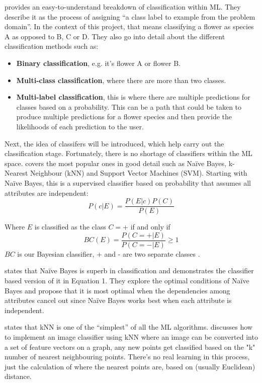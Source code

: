 \documentclass[12pt,a4paper]{report}
\begin{document}
\citet{brownlee2020} provides an easy-to-understand breakdown of classification within ML. They describe it 
as the process of assigning “a class label to example from the problem domain”. In the context of this project, that 
means classifying a 
flower as species A as opposed to B, C or D. They also go into detail about the different classification methods such 
as:
\begin{itemize}
    \item \textbf{Binary classification}, e.g. it's flower A or flower B.
    \item \textbf{Multi-class classification}, where there are more than two classes.
    \item \textbf{Multi-label classification}, this is where there are multiple predictions for classes based on a probability. 
    This can be a path that could be taken to produce multiple predictions for a flower species and then provide 
    the likelihoods of each prediction to the user.
\end{itemize}
Next, the idea of classifers will be introduced, which help carry out the classification stage. Fortunately, 
there is no shortage of classifiers within the ML space. \citet{MohammedMohssen2017Ml:a} covers the most popular ones in 
good detail such as Naïve Bayes, k-Nearest Neighbour (kNN) and Support Vector Machines (SVM). Starting with Naïve Bayes, this 
is a supervised classifier based on probability that assumes all attributes are independent:
\begin{equation}
P(c|E) = \frac{P(E|c)P(C)}{P(E)}
\end{equation}

Where \(E\) is classified as the class \(C = +\) if and only if
\[BC(E) = \frac{P(C = +|E)}{P(C = -|E)} \geq 1\]
\(BC\) is our Bayesian classifier, + and - are two separate classes \citep{zhang2004optimality}.

\par

\citet{zhang2004optimality} states that Naïve Bayes is superb in classification and demonstrates the
classifier based version of it in Equation 1. They explore the optimal conditions of Naïve Bayes and propose
that it is most optimal when the dependencies among attributes cancel out since Naïve Bayes works best when each 
attribute is independent.

\par

\citet{MohammedMohssen2017Ml:a} states that kNN is one of the “simplest” of  all the 
ML algorithms. \citet{rosebook2016} discusses how to implement an image classifier using kNN where 
an image can be converted into a set of feature vectors on a graph, any new points get classified based on the "k" 
number of 
nearest neighbouring points. There's no real learning in this process, just the calculation of where the nearest points 
are, based on (usually Euclidean) distance.
\end{document}
